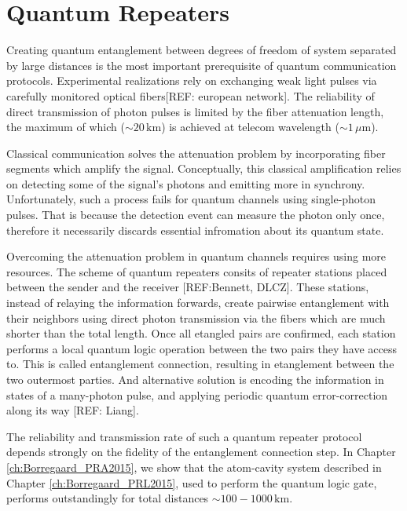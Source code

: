 \section{Quantum Repeaters}
Creating quantum entanglement between degrees of freedom of system separated by
large distances is the most important prerequisite of quantum communication
protocols. Experimental realizations rely on exchanging weak light pulses
via carefully monitored optical fibers[REF: european network]. The
reliability of direct transmission of photon pulses is limited by the
fiber attenuation length, the maximum of which ($\sim 20\,\mathrm{km}$) is
achieved at telecom wavelength ($\sim 1\,\mu\mathrm{m}$).

Classical communication solves the attenuation problem by incorporating fiber
segments which amplify the signal. Conceptually, this classical amplification
relies on detecting some of the signal's photons and emitting more in synchrony.
Unfortunately, such a process fails for quantum channels using single-photon
pulses. That is because the detection event can measure the photon only once,
therefore it necessarily discards essential infromation about its quantum state.

Overcoming the attenuation problem in quantum channels requires using more
resources. The scheme of quantum repeaters consits of repeater stations placed
between the sender and the receiver [REF:Bennett, DLCZ].
These stations, instead of relaying the information forwards, create pairwise
entanglement with their neighbors using direct photon transmission via the
fibers which are much shorter than the total length. Once all etangled pairs are
confirmed, each station performs a local quantum logic operation between the two
pairs they have access to. This is called entanglement connection, resulting in
etanglement between the two outermost parties. And alternative solution is
encoding the information in states of a many-photon pulse, and applying periodic
quantum error-correction along its way [REF: Liang].

The reliability and transmission rate of such a quantum repeater protocol
depends strongly on the fidelity of the entanglement connection step. In Chapter
\ref{ch:Borregaard_PRA2015}, we show that the atom-cavity system described in
Chapter \ref{ch:Borregaard_PRL2015}, used to perform the quantum logic gate,
performs outstandingly for total distances $\sim
100-1000\,\mathrm{km}$.




